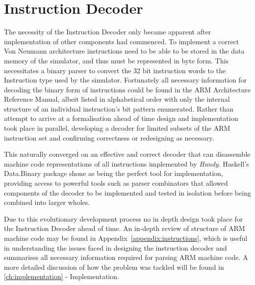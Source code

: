 \section{Instruction Decoder}
\label{sec:design:decoder}

The necessity of the Instruction Decoder only became apparent after implementation of other components had commenced. To implement a correct Von Neumann architecture instructions need to be able to be stored in the data memory of the simulator, and thus must be represented in byte form. This necessitates a binary parser to convert the 32 bit instruction words to the Instruction type used by the simulator. Fortunately all necessary information for decoding the binary form of instructions could be found in the ARM Architecture Reference Manual\citep{armarm:2005}, albeit listed in alphabetical order with only the internal structure of an individual instruction's bit pattern enumerated. Rather than attempt to arrive at a formalisation ahead of time design and implementation took place in parallel, developing a decoder for limited subsets of the ARM instruction set and confirming correctness or redesigning as necessary.

This naturally converged on an effective and correct decoder that can disassemble machine code representations of all instructions implemented by \emph{Handy}. Haskell's Data.Binary package shone as being the perfect tool for implementation, providing access to powerful tools such as parser combinators that allowed components of the decoder to be implemented and tested in isolation before being combined into larger wholes.

Due to this evolutionary development process no in depth design took place for the Instruction Decoder ahead of time. An in-depth review of structure of ARM machine code may be found in Appendix~\ref{appendix:instructions}, which is useful in understanding the issues faced in designing the instruction decoder and summarises all necessary information required for parsing ARM machine code. A more detailed discussion of how the problem was tackled will be found in \autoref{ch:implementation} - Implementation.

